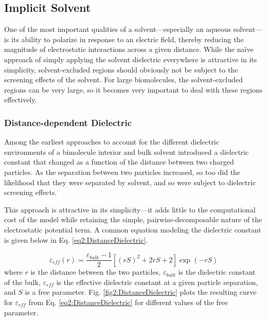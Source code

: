 \subsection{Implicit Solvent}

One of the most important qualities of a solvent---especially an aqueous
solvent---is its ability to polarize in response to an electric field, thereby
reducing the magnitude of electrostatic interactions across a given distance.
While the na\"ive approach of simply applying the solvent dielectric everywhere
is attractive in its simplicity, solvent-excluded regions should obviously not
be subject to the screening effects of the solvent. For large biomolecules, the
solvent-excluded regions can be very large, so it becomes very important to deal
with these regions effectively.

\subsubsection{Distance-dependent Dielectric}

Among the earliest approaches to account for the different dielectric
environments of a bimolecule interior and bulk solvent introduced a dielectric
constant that changed as a function of the distance between two charged
particles. As the separation between two particles increased, so too did the
likelihood that they were separated by solvent, and so were subject to
dielectric screening effects.

This approach is attractive in its simplicity---it adds little to the
computational cost of the model while retaining the simple,
pairwise-decomposable nature of the electrostatic potential term. A common
equation modeling the dielectric constant is given below in Eq.
\ref{eq2:DistanceDielectric}. \cite{Leach_Book_MolModel_2001}

\begin{equation}
   \varepsilon _ {eff} (r) = \frac {\varepsilon_{bulk} - 1} 2 \left [ (rS) ^2 +
   2rS + 2 \right ] \exp(-rS)
   \label{eq2:DistanceDielectric}
\end{equation}
where $r$ is the distance between the two particles, $\varepsilon_{bulk}$ is the
dielectric constant of the bulk, $\varepsilon_{eff}$ is the effective
dielectric constant at a given particle separation, and $S$ is a free parameter.
Fig. \ref{fig2:DistanceDielectric} plots the resulting curve for
$\varepsilon_{eff}$ from Eq. \ref{eq2:DistanceDielectric} for different values
of the free parameter.


